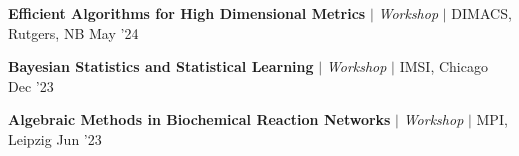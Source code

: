 
\resumeProjectHeading
{\textbf{Efficient Algorithms for High Dimensional Metrics} $|$ \textit{\color{gray}Workshop} $|$ DIMACS, Rutgers, NB}
{May '24}
{}
\vspace{\mygap}

\resumeProjectHeading
{\textbf{Bayesian Statistics and Statistical Learning} $|$ \textit{\color{gray}Workshop} $|$ IMSI, Chicago}
{Dec '23}
{}
\vspace{\mygap}





\resumeProjectHeading
{\textbf{Algebraic Methods in Biochemical Reaction Networks} $|$ \textit{\color{gray}Workshop}  $|$ MPI, Leipzig}
{{Jun '23}}
{}


%


